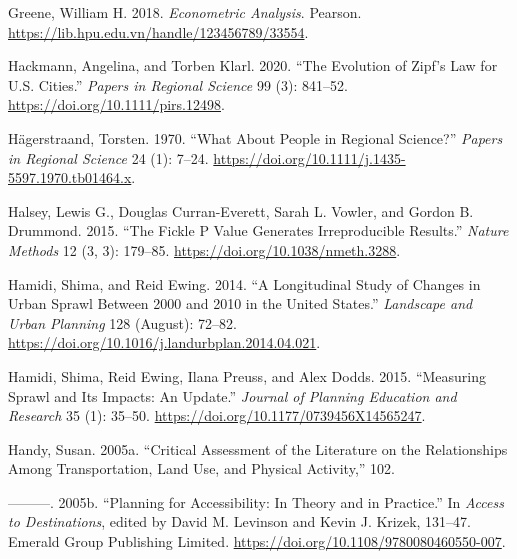 \documentclass[
  11pt,
  openany]{memoir}
\newlength{\cslhangindent}
\newlength{\cslentryspacingunit} %
\newenvironment{CSLReferences}[2] %
 {%
  \setlength{\parindent}{0pt}
  \ifodd #1
  \let\oldpar\par
  \def\par{\hangindent=\cslhangindent\oldpar}
  \fi
  \setlength{\parskip}{#2\cslentryspacingunit}
 }%
 {}
\begin{document}
\begin{CSLReferences}{1}{0}
\leavevmode{}%
Greene, William H. 2018. \emph{Econometric {Analysis}}. {Pearson}. \url{https://lib.hpu.edu.vn/handle/123456789/33554}.

\leavevmode{}%
Hackmann, Angelina, and Torben Klarl. 2020. {``The Evolution of {Zipf}'s {Law} for {U}.{S}. Cities.''} \emph{Papers in Regional Science} 99 (3): 841--52. \url{https://doi.org/10.1111/pirs.12498}.

\leavevmode{}%
Hägerstraand, Torsten. 1970. {``What {About People} in {Regional Science}?''} \emph{Papers in Regional Science} 24 (1): 7--24. \url{https://doi.org/10.1111/j.1435-5597.1970.tb01464.x}.

\leavevmode{}%
Halsey, Lewis G., Douglas Curran-Everett, Sarah L. Vowler, and Gordon B. Drummond. 2015. {``The Fickle {P} Value Generates Irreproducible Results.''} \emph{Nature Methods} 12 (3, 3): 179--85. \url{https://doi.org/10.1038/nmeth.3288}.

\leavevmode{}%
Hamidi, Shima, and Reid Ewing. 2014. {``A Longitudinal Study of Changes in Urban Sprawl Between 2000 and 2010 in the {United States}.''} \emph{Landscape and Urban Planning} 128 (August): 72--82. \url{https://doi.org/10.1016/j.landurbplan.2014.04.021}.

\leavevmode{}%
Hamidi, Shima, Reid Ewing, Ilana Preuss, and Alex Dodds. 2015. {``Measuring {Sprawl} and {Its Impacts}: An {Update}.''} \emph{Journal of Planning Education and Research} 35 (1): 35--50. \url{https://doi.org/10.1177/0739456X14565247}.

\leavevmode{}%
Handy, Susan. 2005a. {``Critical {Assessment} of the {Literature} on the {Relationships Among Transportation}, {Land Use}, and {Physical Activity},''} 102.

\leavevmode{}%
---------. 2005b. {``Planning for {Accessibility}: In {Theory} and in {Practice}.''} In \emph{Access to {Destinations}}, edited by David M. Levinson and Kevin J. Krizek, 131--47. {Emerald Group Publishing Limited}. \url{https://doi.org/10.1108/9780080460550-007}.


\end{CSLReferences}
\end{document}
